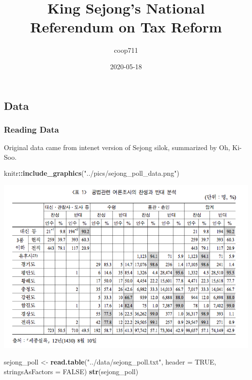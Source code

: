 \documentclass[
]{article}
\title{King Sejong's National Referendum on Tax Reform}
\author{coop711}
\date{2020-05-18}
\newenvironment{Shaded}{\begin{snugshade}}{\end{snugshade}}
\newcommand{\DataTypeTok}[1]{\textcolor[rgb]{0.13,0.29,0.53}{#1}}
\newcommand{\KeywordTok}[1]{\textcolor[rgb]{0.13,0.29,0.53}{\textbf{#1}}}
\newcommand{\NormalTok}[1]{#1}
\newcommand{\OperatorTok}[1]{\textcolor[rgb]{0.81,0.36,0.00}{\textbf{#1}}}
\newcommand{\OtherTok}[1]{\textcolor[rgb]{0.56,0.35,0.01}{#1}}
\newcommand{\StringTok}[1]{\textcolor[rgb]{0.31,0.60,0.02}{#1}}
\begin{document}
\maketitle

\hypertarget{data}{%
\subsection{Data}\label{data}}

\hypertarget{reading-data}{%
\subsubsection{Reading Data}\label{reading-data}}

Original data came from intenet version of Sejong silok, summarized by
Oh, Ki-Soo.

\begin{Shaded}
\begin{Highlighting}[]
\NormalTok{knitr}\OperatorTok{::}\KeywordTok{include\_graphics}\NormalTok{(}\StringTok{"../pics/sejong\_poll\_data.png"}\NormalTok{)}
\end{Highlighting}
\end{Shaded}

\includegraphics[width=1\linewidth]{../pics/sejong_poll_data}

\begin{Shaded}
\begin{Highlighting}[]
\NormalTok{sejong\_poll \textless{}{-}}\StringTok{ }\KeywordTok{read.table}\NormalTok{(}\StringTok{"../data/sejong\_poll.txt"}\NormalTok{, }\DataTypeTok{header =} \OtherTok{TRUE}\NormalTok{, }\DataTypeTok{stringsAsFactors =} \OtherTok{FALSE}\NormalTok{)}
\KeywordTok{str}\NormalTok{(sejong\_poll)}
\end{Highlighting}
\end{Shaded}
\end{document}
